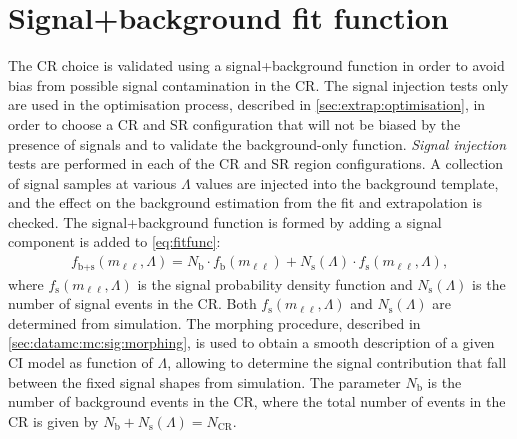 \section{Signal+background fit function}\label{sec:sigmodel}
The CR choice is validated using a signal+background function in order to avoid bias from possible signal contamination in the CR. The signal injection tests only are used in the optimisation process, described in \cref{sec:extrap:optimisation}, in order to choose a CR and SR configuration that will not be biased by the presence of signals and to validate the background-only function. \emph{Signal injection} tests are performed in each of the CR and SR region configurations. A collection of signal samples at various $\Lambda$ values are injected into the background template, and the effect on the background estimation from the fit and extrapolation is checked. The signal+background function is formed by adding a signal component is added to \cref{eq:fitfunc}: 
\begin{equation}
    \label{eq:sbfunction}
    \begin{aligned}
    f_\textrm{b+s}(m_{\ell\ell},\Lambda) = N_\textrm{b}\cdot f_\textrm{b}(m_{\ell\ell}) + N_\textrm{s}(\Lambda)\cdot f_\textrm{s}(m_{\ell\ell},\Lambda),
    \end{aligned} 
\end{equation}
where $f_\textrm{s}(m_{\ell\ell},\Lambda)$ is the signal probability density function and $N_\textrm{s}(\Lambda)$ is the number of signal events in the CR. Both $f_\textrm{s}(m_{\ell\ell},\Lambda)$ and $N_\textrm{s}(\Lambda)$ are determined from simulation. The morphing procedure, described in \cref{sec:datamc:mc:sig:morphing}, is used to obtain a smooth description of a given CI model as function of $\Lambda$, allowing to determine the signal contribution that fall between the fixed signal shapes from simulation. The parameter $N_\textrm{b}$ is the number of background events in the CR, where the total number of events in the CR is given by $N_\textrm{b}+N_\textrm{s}(\Lambda)=N_\textrm{CR}$. 

